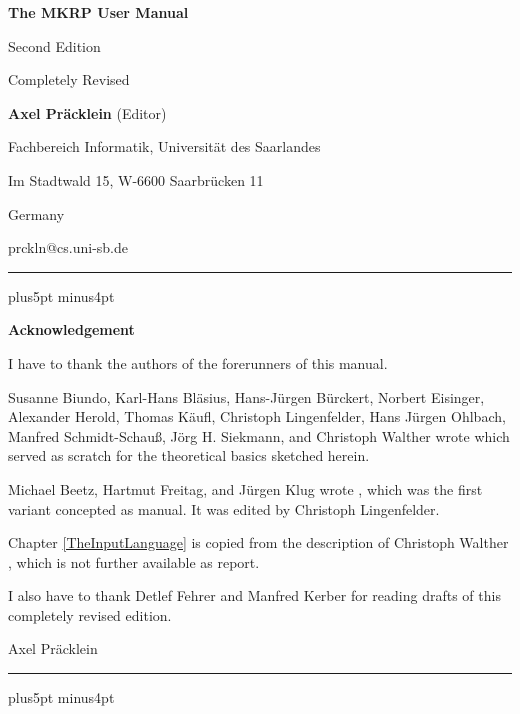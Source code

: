 \begin{titlepage}
\vfill\vfill

\centerline{\Huge \bf The MKRP User Manual}
\vspace{5mm}
\centerline{\LARGE Second Edition}
\vspace{3mm}
\centerline{\Large Completely Revised}


\vfill


\centerline{\large {\bf Axel Pr\"acklein} (Editor)}
\vspace{2mm}
\centerline{\large  Fachbereich Informatik, Universit\"at des Saarlandes}
\centerline{\large  Im Stadtwald 15, W-6600 Saarbr\"ucken 11}
\centerline{\large  Germany}
\centerline{\large prckln@cs.uni-sb.de}

\vfill
\begin{center}
\begin{minipage}{11cm}

\hrule
\vspace{3mm}
\parskip5pt plus5pt minus4pt

\centerline{\large \bf Acknowledgement}
\vspace{3mm}

I have to thank the authors of the forerunners of this manual.

Susanne Biundo, Karl-Hans Bl\"asius, Hans-J\"urgen
B\"urckert, Norbert Eisinger, Alexander Herold, Thomas K\"aufl,
Chri\-stoph Lingenfelder, Hans J\"urgen Ohlbach, Manfred
Schmidt-Schau\ss, J\"org H. Siekmann, and Christoph Walther wrote 
\cite{Raph84} which served as scratch for the theoretical basics
sketched herein.

Michael Beetz, Hartmut Freitag, and J\"urgen Klug wrote \cite{BeFrKlLi88},
which was the first
variant concepted as manual. It was edited by Christoph Lingenfelder.

Chapter \ref{TheInputLanguage} is copied from the description of
Christoph Walther \cite{Walther82}, which is not further available as
report.

I also have to thank Detlef Fehrer and Manfred Kerber for reading
drafts of this completely revised edition.

Axel Pr\"acklein

\vspace{3mm}
\hrule

\end{minipage}
\end{center}
\vfill
\end{titlepage}

\parskip5pt plus5pt minus4pt


